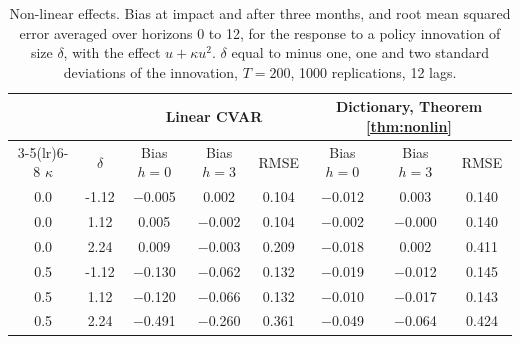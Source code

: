 \begin{table}[H]
\centering\small
\caption{Non-linear effects. Bias at impact and after three months, and root mean squared error averaged over horizons 0 to 12, for the response to a policy innovation of size $\delta$, with the effect $u+\kappa u^2$. $\delta$ equal to minus one, one and two standard deviations of the innovation, $T=200$, 1000 replications, 12 lags.\label{tab:mc-nonlin}}
\begin{tabular}{cc ccc ccc}
\toprule
 & & \multicolumn{3}{c}{Linear CVAR} & \multicolumn{3}{c}{Dictionary, Theorem \ref{thm:nonlin}}\\
\cmidrule(lr){3-5}\cmidrule(lr){6-8}
$\kappa$ & $\delta$ & Bias $h=0$ & Bias $h=3$ & RMSE & Bias $h=0$ & Bias $h=3$ & RMSE\\
\midrule
0.0 & -1.12 & $-$0.005 & 0.002 & 0.104 & $-$0.012 & 0.003 & 0.140\\
0.0 & 1.12 & 0.005 & $-$0.002 & 0.104 & $-$0.002 & $-$0.000 & 0.140\\
0.0 & 2.24 & 0.009 & $-$0.003 & 0.209 & $-$0.018 & 0.002 & 0.411\\
0.5 & -1.12 & $-$0.130 & $-$0.062 & 0.132 & $-$0.019 & $-$0.012 & 0.145\\
0.5 & 1.12 & $-$0.120 & $-$0.066 & 0.132 & $-$0.010 & $-$0.017 & 0.143\\
0.5 & 2.24 & $-$0.491 & $-$0.260 & 0.361 & $-$0.049 & $-$0.064 & 0.424\\
\bottomrule
\end{tabular}
\end{table}
